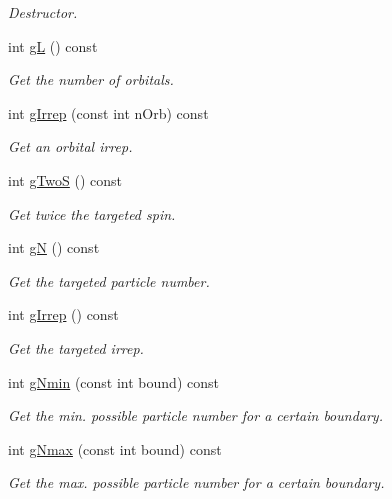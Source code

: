 \begin{DoxyCompactItemize}
\begin{DoxyCompactList}\small\item\em Destructor. \end{DoxyCompactList}\item 
int \hyperlink{classCheMPS2_1_1SyBookkeeper_aff6ffb8d891d6380a7b2770348a0dcd7}{g\-L} () const 
\begin{DoxyCompactList}\small\item\em Get the number of orbitals. \end{DoxyCompactList}\item 
int \hyperlink{classCheMPS2_1_1SyBookkeeper_ab06fa32f4e352d248ebfe67d850a574a}{g\-Irrep} (const int n\-Orb) const 
\begin{DoxyCompactList}\small\item\em Get an orbital irrep. \end{DoxyCompactList}\item 
int \hyperlink{classCheMPS2_1_1SyBookkeeper_a72189d68fe5a90d9b5e4f11aa752a393}{g\-Two\-S} () const 
\begin{DoxyCompactList}\small\item\em Get twice the targeted spin. \end{DoxyCompactList}\item 
int \hyperlink{classCheMPS2_1_1SyBookkeeper_af39babd5df4cb5eeb84ffc017af841c3}{g\-N} () const 
\begin{DoxyCompactList}\small\item\em Get the targeted particle number. \end{DoxyCompactList}\item 
int \hyperlink{classCheMPS2_1_1SyBookkeeper_a280917b55df99e07e707f7e088b5f58d}{g\-Irrep} () const 
\begin{DoxyCompactList}\small\item\em Get the targeted irrep. \end{DoxyCompactList}\item 
int \hyperlink{classCheMPS2_1_1SyBookkeeper_a00b1b29641aade9ff5f4ce68e46c8320}{g\-Nmin} (const int bound) const 
\begin{DoxyCompactList}\small\item\em Get the min. possible particle number for a certain boundary. \end{DoxyCompactList}\item 
int \hyperlink{classCheMPS2_1_1SyBookkeeper_a39bc51595360d808a224ca6021ead99b}{g\-Nmax} (const int bound) const 
\begin{DoxyCompactList}\small\item\em Get the max. possible particle number for a certain boundary. \end{DoxyCompactList}\item 

\end{DoxyCompactItemize}
